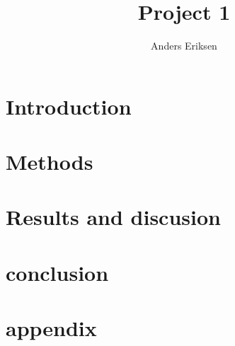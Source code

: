 \documentclass[10pt, twocolumn]{revtex4-1}
\begin{document}
\title{Project 1}
\author{Anders Eriksen}
\begin{abstract}
\end{abstract}

\section{Introduction}

\section{Methods}

\section{Results and discusion}

\section{conclusion}

\section{appendix}
\end{document}
